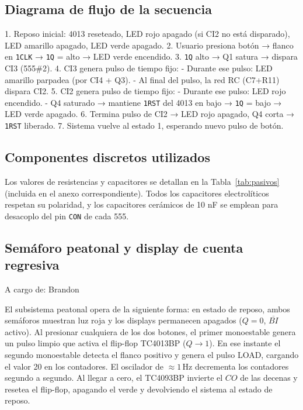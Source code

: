 \documentclass[journal]{IEEEtran}
\begin{document}
\subsection{Diagrama de flujo de la secuencia}

1. Reposo inicial: 4013 reseteado, LED rojo apagado (si CI2 no está disparado), LED amarillo apagado, LED verde apagado.
2. Usuario presiona botón → flanco en \texttt{1CLK} → \texttt{1Q} = alto → LED verde encendido.
3. \texttt{1Q} alto → Q1 satura → dispara CI3 (555\#2).
4. CI3 genera pulso de tiempo fijo:
   - Durante ese pulso: LED amarillo parpadea (por CI4 + Q3).
   - Al final del pulso, la red RC (C7+R11) dispara CI2.
5. CI2 genera pulso de tiempo fijo:
   - Durante ese pulso: LED rojo encendido.
   - Q4 saturado → mantiene \texttt{1RST} del 4013 en bajo → \texttt{1Q} = bajo → LED verde apagado.
6. Termina pulso de CI2 → LED rojo apagado, Q4 corta → \texttt{1RST} liberado.
7. Sistema vuelve al estado 1, esperando nuevo pulso de botón.

\subsection{Componentes discretos utilizados}

Los valores de resistencias y capacitores se detallan en la Tabla~\ref{tab:pasivos} (incluida en el anexo correspondiente). Todos los capacitores electrolíticos respetan su polaridad, y los capacitores cerámicos de 10 nF se emplean para desacoplo del pin \texttt{CON} de cada 555.
\subsection{Semáforo peatonal y display de cuenta regresiva}
A cargo de: Brandon

El subsistema peatonal opera de la siguiente forma: en estado de reposo, ambos semáforos
muestran luz roja y los displays permanecen apagados ($Q = 0$, $\overline{BI}$ activo).
Al presionar cualquiera de los dos botones, el primer monoestable genera un pulso limpio
que activa el flip-flop TC4013BP ($Q \to 1$). En ese instante el segundo monoestable
detecta el flanco positivo y genera el pulso LOAD, cargando el valor 20 en los contadores.
El oscilador de $\approx 1\,\text{Hz}$ decrementa los contadores segundo a segundo. Al
llegar a cero, el TC4093BP invierte el $CO$ de las decenas y resetea el flip-flop,
apagando el verde y devolviendo el sistema al estado de reposo.
\end{document}
